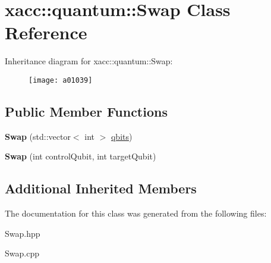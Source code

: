 \hypertarget{a01039}{}\section{xacc\+:\+:quantum\+:\+:Swap Class Reference}
\label{a01039}
Inheritance diagram for xacc\+:\+:quantum\+:\+:Swap\+:\begin{figure}[H]
\begin{center}
\leavevmode
\texttt{[image: a01039]}
\end{center}
\end{figure}
\subsection*{Public Member Functions}
\begin{DoxyCompactItemize}
\item 
\mbox{\label{a01039_a5c35a23a635f235a5615be65e769c121}} 
{\bfseries Swap} (std\+::vector$<$ int $>$ \hyperlink{a00991_a2a56be6c2519ea65df4d06f4abae1393}{qbits})
\item 
\mbox{\label{a01039_ac19efe303b798e14441a2c235b5ba7f3}} 
{\bfseries Swap} (int control\+Qubit, int target\+Qubit)
\end{DoxyCompactItemize}
\subsection*{Additional Inherited Members}


The documentation for this class was generated from the following files\+:\begin{DoxyCompactItemize}
\item 
Swap.\+hpp\item 
Swap.\+cpp\end{DoxyCompactItemize}
